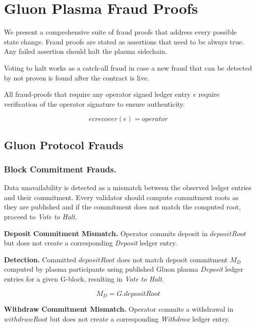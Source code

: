 \documentclass[12pt,a4paper]{article}
\begin{document}
\section{Gluon Plasma Fraud Proofs}

We present a comprehensive suite of fraud proofs that address every possible state change. Fraud proofs are stated as assertions that need to be always true. Any failed assertion should halt the plasma sidechain. 

Voting to halt works as a catch-all fraud in case a new fraud that can be detected by not proven is found after the contract is live.

All fraud-proofs that require any operator signed ledger entry $e$ require verification of the operator signature to ensure authenticity.

\begin{equation}
    ecrecover(e) = operator
\end{equation}

\subsection{Gluon Protocol Frauds}

\subsubsection{Block Commitment Frauds.}\label{fp:bcf}
Data unavailability is detected as a mismatch between the observed ledger entries and their commitment. Every validator should compute commitment roots as they are published and if the commitment does not match the computed root, proceed to \emph{Vote to Halt}.

\textbf{Deposit Commitment Mismatch.} Operator commits deposit in $depositRoot$ but does not create a corresponding \emph{Deposit} ledger entry.

\textbf{Detection.} 
Committed $depositRoot$ does not match deposit commitment $M_D$ computed by plasma participants using published Gluon plasma \emph{Deposit} ledger entries for a given G-block, resulting in \emph{Vote to Halt}.

\begin{equation}
M_D = G.depositRoot
\end{equation}

\textbf{Withdraw Commitment Mismatch.} 
Operator commits a withdrawal in $withdrawRoot$ but does not create a corresponding \emph{Withdraw} ledger entry.
\end{document}
